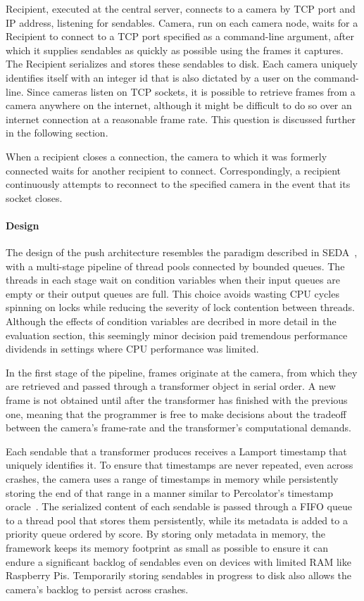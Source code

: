 Recipient, executed at the
central server, connects to a camera by TCP port and IP address, listening
for sendables.  Camera, run on each camera node, waits for a Recipient to
connect to a TCP port specified as a command-line argument, after which it
supplies sendables as quickly as possible using the frames it captures.  The
Recipient serializes and stores these sendables to disk.  Each camera uniquely
identifies itself with an integer id that is also dictated by a user on the command-line.
Since cameras listen on TCP sockets, it is possible to retrieve frames from a camera
anywhere on the internet, although it might be difficult to do so over an internet
connection at a reasonable frame rate.  This question is discussed further in the following section.

When a recipient closes a connection, the camera to which it was formerly connected
waits for another recipient to connect.  Correspondingly, a recipient continuously
attempts to reconnect to the specified camera in the event that its socket closes.


\paragraph{Design}

The design of the push architecture resembles the paradigm described in
SEDA~\cite{seda}, with a multi-stage pipeline of thread pools connected
by bounded queues. The threads in each stage wait on condition variables
when their input queues are empty or their output queues are full.  This
choice avoids wasting CPU cycles spinning on locks while reducing the severity
of lock contention between threads.  Although the effects of condition variables
are decribed in more detail in the evaluation section, this seemingly minor
decision paid tremendous performance dividends in settings where CPU
performance was limited.

In the first stage of the pipeline, frames originate at the camera, from which they
are retrieved and passed through a transformer object in serial order.  A
new frame is not obtained until after the transformer has finished with the
previous one, meaning that the programmer is free to make decisions about
the tradeoff between the camera's frame-rate and the transformer's
computational demands.

Each sendable that a transformer produces receives
a Lamport timestamp that uniquely identifies it.  To ensure that timestamps are
never repeated, even across crashes, the camera uses a range of timestamps in memory while
persistently storing the end of that range in a manner similar to Percolator's
timestamp oracle~\cite{percolator}.  The serialized content of each sendable
is passed through a FIFO queue to a thread pool that stores them persistently,
while its metadata is added to a priority queue ordered by score.  By storing only
metadata in memory, the framework keeps its memory footprint as small as possible to ensure it can
endure a significant backlog of sendables even on devices with limited RAM
like Raspberry Pis.  Temporarily storing sendables in progress to disk also allows the
camera's backlog to persist across crashes.

